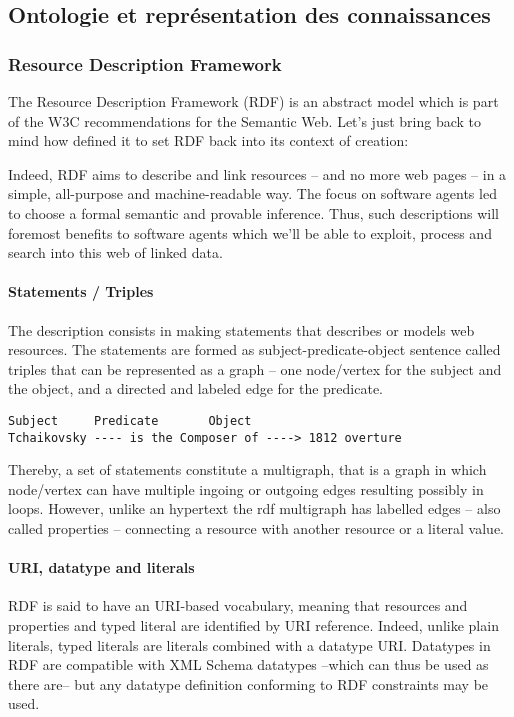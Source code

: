 \subsection{Ontologie et représentation des connaissances}
\subsubsection{Resource Description Framework}
The Resource  Description Framework (RDF) is an abstract model which is part of the W3C recommendations for the Semantic Web. 
Let's just bring back to mind how  defined it to set RDF back into its context of creation: 


Indeed, RDF aims to describe and link resources – and no more web pages – in a simple, all-purpose and machine-readable way. 
The focus on software agents led to choose a formal semantic and provable inference. 
Thus, such descriptions will foremost benefits to software agents which we'll be able to exploit, process and search into this web of linked data. 

\paragraph{Statements / Triples}
The description consists in making statements that describes or models web resources. The statements are formed as subject-predicate-object sentence called triples that can be represented as a graph – one node/vertex for the subject and the object, and a directed and labeled edge for the predicate. 
\begin{Verbatim}[fontsize=\small,formatcom=\color{black!70}]
Subject		Predicate	    Object	
Tchaikovsky ---- is the Composer of ----> 1812 overture
\end{Verbatim}
Thereby, a set of statements constitute a multigraph, that is a graph in which node/vertex can have multiple ingoing or outgoing edges resulting possibly in loops. 
However, unlike an hypertext the rdf multigraph has labelled edges – also called properties -- connecting a resource with another resource or a literal value.

\paragraph{URI, datatype and literals}
RDF is said to have an URI-based vocabulary, meaning that resources and properties and typed literal are identified by URI reference. 
Indeed, unlike plain literals, typed literals are literals combined with a datatype URI.
Datatypes in RDF are compatible with XML Schema datatypes --which can thus be used as there are-- but any datatype definition conforming to RDF constraints may be used.

